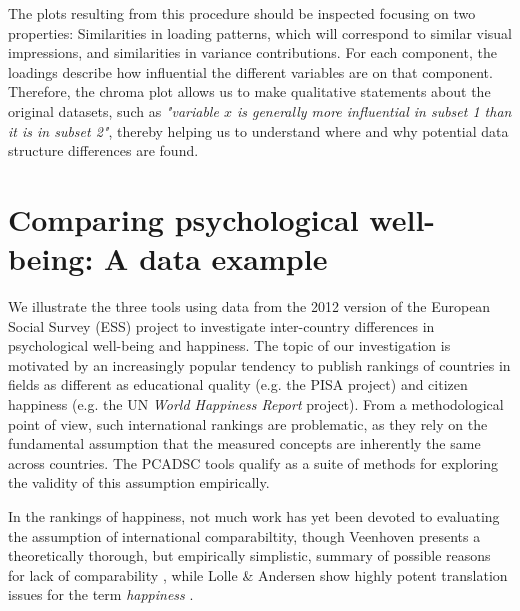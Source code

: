 \documentclass[a4paper,14pt]{article}
\begin{document}
The plots resulting from this procedure should be inspected focusing on two properties: Similarities in loading patterns, which will correspond to similar visual impressions, and similarities in variance contributions. For each component, the loadings describe how influential the different variables are on that component. Therefore, the chroma plot allows us to make qualitative statements about the original datasets, such as \textit{"variable $x$ is generally more influential in subset 1 than it is in subset 2"}, thereby helping us to understand where and why potential data structure differences are found.


\section*{Comparing psychological well-being: A data example}\label{sec:dataexample}


We illustrate the three tools using data from the 2012 version of the European Social Survey (ESS) project to investigate inter-country differences in psychological well-being and happiness. The topic of our investigation is motivated by an increasingly popular tendency to publish rankings of countries in fields as different as educational quality (e.g. the PISA project) and citizen happiness (e.g. the UN \textit{World Happiness Report} project). From a methodological point of view, such international rankings are problematic, as they rely on the fundamental assumption that the measured concepts are inherently the same across countries. The PCADSC tools qualify as a suite of methods for exploring the validity of this assumption empirically.

In the rankings of happiness, not much work has yet been devoted to evaluating the assumption of international comparabiltity, though Veenhoven presents a theoretically thorough, but empirically simplistic, summary of possible reasons for lack of comparability \cite{Veenhoven2012}, while Lolle \& Andersen show highly potent translation issues for the term \textit{happiness} \cite{Lolle2016}.

\end{document}
